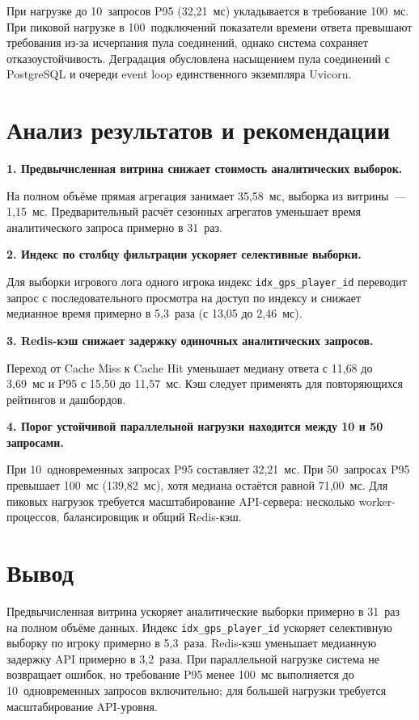 При нагрузке до 10~запросов P95 (32{,}21~мс) укладывается в требование 100~мс.
При пиковой нагрузке в 100~подключений показатели времени ответа превышают
требования из-за исчерпания пула соединений, однако система сохраняет
отказоустойчивость. Деградация обусловлена насыщением пула соединений
с PostgreSQL и очереди event loop единственного экземпляра Uvicorn.

\section{Анализ результатов и рекомендации}

\textbf{1. Предвычисленная витрина снижает стоимость аналитических выборок.}

На полном объёме прямая агрегация занимает 35{,}58~мс, выборка из витрины~---
1{,}15~мс. Предварительный расчёт сезонных агрегатов уменьшает время
аналитического запроса примерно в 31~раз.

\textbf{2. Индекс по столбцу фильтрации ускоряет селективные выборки.}

Для выборки игрового лога одного игрока индекс \texttt{idx\_gps\_player\_id}
переводит запрос с последовательного просмотра на доступ по индексу
и снижает медианное время примерно в 5{,}3~раза (с 13{,}05 до 2{,}46~мс).

\textbf{3. Redis-кэш снижает задержку одиночных аналитических запросов.}

Переход от Cache Miss к Cache Hit уменьшает медиану ответа с 11{,}68
до 3{,}69~мс и P95 с 15{,}50 до 11{,}57~мс. Кэш следует применять для
повторяющихся рейтингов и дашбордов.

\textbf{4. Порог устойчивой параллельной нагрузки находится между 10 и 50 запросами.}

При 10~одновременных запросах P95 составляет 32{,}21~мс. При 50~запросах
P95 превышает 100~мс (139{,}82~мс), хотя медиана остаётся равной 71{,}00~мс. Для пиковых
нагрузок требуется масштабирование API-сервера: несколько worker-процессов,
балансировщик и общий Redis-кэш.

\section*{Вывод}

Предвычисленная витрина ускоряет аналитические выборки примерно в 31~раз
на полном объёме данных. Индекс \texttt{idx\_gps\_player\_id} ускоряет
селективную выборку по игроку примерно в 5{,}3~раза. Redis-кэш уменьшает
медианную задержку API примерно в 3{,}2~раза. При параллельной нагрузке система не возвращает ошибок,
но требование P95 менее 100~мс выполняется до 10~одновременных запросов
включительно; для большей нагрузки требуется масштабирование API-уровня.
